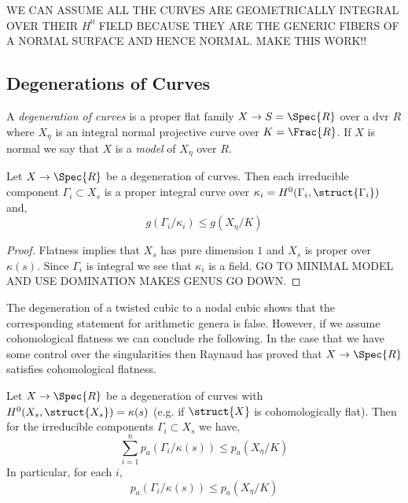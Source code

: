 \documentclass[12pt]{article}
\begin{document}
WE CAN ASSUME ALL THE CURVES ARE GEOMETRICALLY INTEGRAL OVER THEIR $H^0$ FIELD BECAUSE THEY ARE THE GENERIC FIBERS OF A NORMAL SURFACE AND HENCE NORMAL. MAKE THIS WORK!!



\subsection{Degenerations of Curves}

\begin{defn}
A \textit{degeneration of curves} is a proper flat family $X \to S = \Spec{R}$ over a dvr $R$ where $X_{\eta}$ is an integral normal projective curve over $K = \Frac{R}$. If $X$ is normal we say that $X$ is a \textit{model} of $X_{\eta}$ over $R$.
\end{defn}

\begin{prop}
Let $X \to \Spec{R}$ be a degeneration of curves. Then each irreducible component $\Gamma_i \subset X_s$ is a proper integral curve over $\kappa_i = H^0(\Gamma_i, \struct{\Gamma_i})$ and,
\[ g(\Gamma_i/\kappa_i) \le g(X_{\eta}/K) \]
\end{prop}

\begin{proof}
Flatness implies that $X_s$ has pure dimension $1$ and $X_s$ is proper over $\kappa(s)$. Since $\Gamma_i$ is integral we see that $\kappa_i$ is a field. GO TO MINIMAL MODEL AND USE DOMINATION MAKES GENUS GO DOWN.
\end{proof}

\begin{rmk}
The degeneration of a twisted cubic to a nodal cubic shows that the corresponding statement for arithmetic genera is false. However, if we assume cohomological flatness we can conclude rhe following. In the case that we have some control over the singularities then Raynaud has proved that $X \to \Spec{R}$ satisfies cohomological flatness.
\end{rmk}

\begin{prop}
Let $X \to \Spec{R}$ be a degeneration of curves with $H^0(X_s, \struct{X_s}) = \kappa(s)$ (e.g. if $\struct{X}$ is cohomologically flat). Then for the irreducible components $\Gamma_i \subset X_s$ we have,
\[ \sum_{i = 1}^n p_a(\Gamma_i / \kappa(s)) \le p_a(X_\eta / K) \]
In particular, for each $i$,
\[ p_a(\Gamma_i / \kappa(s)) \le p_a(X_\eta / K) \]
\end{prop}
\end{document}
